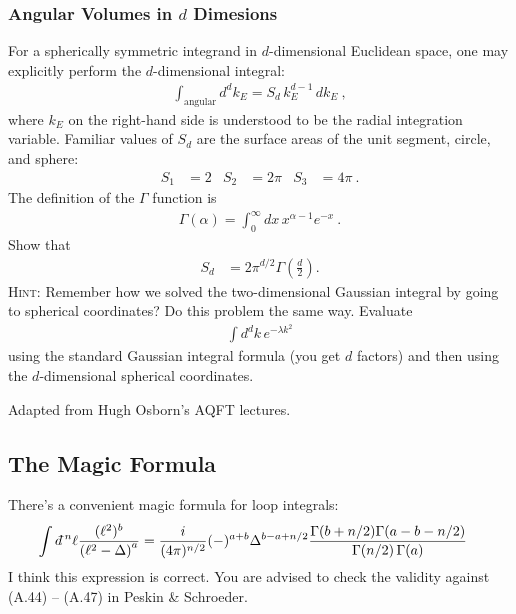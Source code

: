 \documentclass[12pt]{article}
\numberwithin{equation}{subsection}    %
\newcommand{\dbar}{d\mkern-6mu\mathchar'26}    %
\begin{document}
\subsubsection{Angular Volumes in \texorpdfstring{$d$}{d} Dimesions}

For a spherically symmetric integrand in $d$-dimensional Euclidean space, one may explicitly perform the $d$-dimensional integral:
\begin{align}
	\int_\text{angular} d^dk_E = S_d\, k_E^{d-1} \,dk_E \ ,
\end{align}
where $k_E$ on the right-hand side is understood to be the radial integration variable. Familiar values of $S_d$ are the surface areas of the unit segment, circle, and sphere:
\begin{align}
	S_1 &=2 
	&
	S_2 &=2\pi
	&
	S_3&=4\pi \ .
\end{align}
The definition of the $\Gamma$ function is 
\begin{align}
	\Gamma(\alpha) = \int_0^\infty dx\, x^{\alpha-1}e^{-x} \ .
\end{align}
Show that 
\begin{align}
	S_d &= 2\pi^{d/2}\Gamma\left(\frac{d}{2}\right).
\end{align}
\textsc{Hint}: 
Remember how we solved the two-dimensional Gaussian integral by going to spherical coordinates? Do this problem the same way. Evaluate
\begin{align}
	\int d^d k \, e^{-\lambda k^2}
\end{align}
using the standard Gaussian integral formula (you get $d$ factors) and then using the $d$-dimensional spherical coordinates. 



{\footnotesize Adapted from Hugh Osborn's AQFT lectures.}


\subsection{The Magic Formula}

There's a convenient magic formula for loop integrals:
\begin{align}
	\int \dbar^n \ell \frac{(\ell^2)^b}{\left(\ell^2 - \Delta\right)^a}
	&= 
	\frac{i}{(4\pi)^{n/2}}(-)^{a+b}
	\Delta^{b-a+n/2}
	\frac{\Gamma(b+n/2)\Gamma(a-b-n/2)}{\Gamma(n/2)\,\Gamma(a)}
\end{align}
I think this expression is correct. You are advised to check the validity against (A.44) -- (A.47) in Peskin \& Schroeder. 
\end{document}
